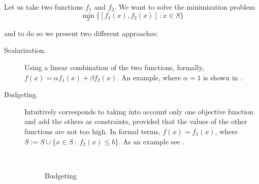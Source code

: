 \documentclass[computationalMathematics.tex]{subfiles}
\begin{document}
\begin{example}
	Let us take two functions $f_1$ and $f_2$. We want to solve the minimization problem
	\begin{equation}
	\tag{P}\min\limits_x \{[f_1(x),f_2(x)]~:x \in S\}
	\end{equation}
	
	and to do so we present two different approaches:

	\begin{description}
		\item[{\sc Scalarization.}] Using a linear combination of the two functions, formally, $f(x) = \alpha f_1(x) + \beta f_2(x)$. An example, where $\alpha =1$ is shown in .
		\item[{\sc Budgeting.}]  Intuitively corresponds to taking into account only one objective function and add the others as constraints, provided that the values of the other functions are not too high. In formal terms, $f(x) = f_1(x)$, where $S := S \cup \{ x \in S~:~f_2(x) \leq b \}$. As an example see .
		
		\begin{figure}[htb]
			\centering
			\hspace{0.5cm}
			\\
			\caption{Budgeting}
			\label{fig:21sett_budgeting}
		\end{figure}
	
	\end{description}
\end{example}
\end{document}
